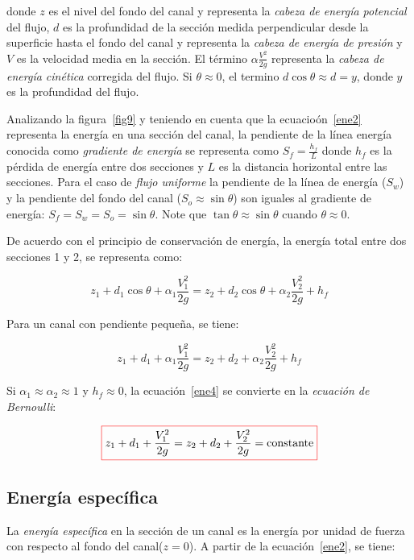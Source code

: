 \documentclass[11pt, oneside]{article}
\begin{document}
donde $z$ es el nivel del fondo del canal y representa la \emph{cabeza de energ\'ia potencial} del flujo, $d$ es la profundidad de la secci\'on medida perpendicular desde la superficie hasta el fondo del canal y representa la \emph{cabeza de energ\'ia de presi\'on} y $V$ es la velocidad media en la secci\'on. El t\'ermino $\alpha \frac{V^2}{2g}$ representa la \emph{cabeza de energ\'ia cin\'etica} corregida del flujo. Si $\theta \approx 0$, el termino $d \cos \theta \approx d = y$, donde $y$ es la profundidad del flujo. 

Analizando la figura~\ref{fig9} y teniendo en cuenta que la ecuacio\'on~\ref{ene2} representa la energ\'ia en una secci\'on del canal, la pendiente de la l\'inea energ\'ia conocida como \emph{gradiente de energ\'ia} se representa como $S_f=\frac{h_f}{L}$ donde $h_f$ es la p\'erdida de energ\'ia entre dos secciones y $L$ es la distancia horizontal entre las secciones. Para el caso de \emph{flujo uniforme} la pendiente de la l\'inea de energ\'ia ($S_w$) y la pendiente del fondo del canal ($S_o \approx \sin \theta$) son iguales al gradiente de energ\'ia: $S_f = S_w = S_o = \sin \theta$. Note que $\tan \theta \approx \sin \theta$ cuando $\theta \approx 0$. 

De acuerdo con el principio de conservaci\'on de energ\'ia, la energ\'ia total entre dos secciones 1 y 2, se representa como:

\begin{equation}
z_1 + d_1 \cos \theta + \alpha_1 \frac{V_1^2}{2g} = z_2 + d_2 \cos \theta + \alpha_2 \frac{V_2^2}{2g} + h_{f}
\label{ene3}
\end{equation}

Para un canal con pendiente peque\~na, se tiene:

\begin{equation}
 z_1 + d_1 + \alpha_1 \frac{V_1^2}{2g} = z_2 + d_2 + \alpha_2 \frac{V_2^2}{2g} + h_{f}
\label{ene4}
\end{equation}

Si $\alpha_1 \approx \alpha_2 \approx 1$ y $h_f \approx 0$, la ecuaci\'on~\ref{ene4} se convierte en la \emph{ecuaci\'on de Bernoulli}:

\begin{equation}
\color{red}\boxed{\color{black} z_1 + d_1 + \frac{V_1^2}{2g} = z_2 + d_2 + \frac{V_2^2}{2g} = \text{constante}}
\label{ene5}
\end{equation}

\subsection{Energ\'ia espec\'ifica}
La \emph{energ\'ia espec\'ifica} en la secci\'on de un canal es la energ\'ia por unidad de fuerza con respecto al fondo del canal($z=0$). A partir de la ecuaci\'on~\ref{ene2}, se tiene:
\end{document}
